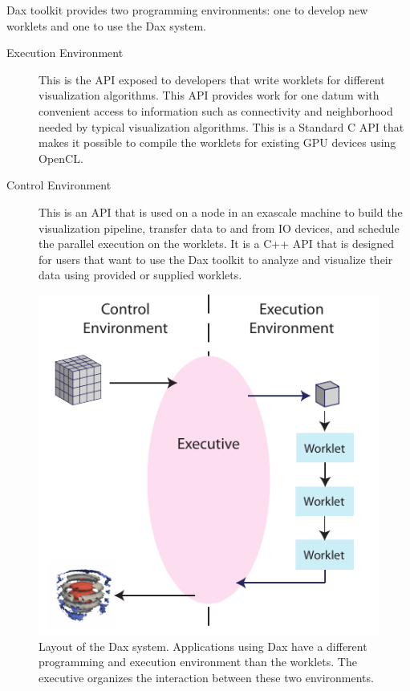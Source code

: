 \documentclass{vgtc}                          %
\begin{document}
Dax toolkit provides two programming environments: one to develop new worklets and one to use the Dax system.

\begin{description}
\item[Execution Environment] This is the API exposed to developers that
write worklets for different visualization algorithms. This API provides
work for one datum with convenient access to information such as
connectivity and neighborhood needed by typical visualization algorithms. This
is a Standard C API that makes it possible to compile the worklets for
existing GPU devices using OpenCL.
\item[Control Environment] This is an API that is used on a node in an
exascale machine to build the visualization pipeline, transfer data to and from
IO devices, and schedule the parallel execution on the worklets. It is a C++ API
that is designed for users that want to use the Dax toolkit to analyze and
visualize their data using provided or supplied worklets.
\end{description}

\begin{figure}
  \centering
  \includegraphics{images/DaxDiagram}
  \caption{Layout of the Dax system.
    Applications using Dax have a different programming and execution environment than the worklets.
    The executive organizes the interaction between these two environments.}
  \label{fig:DaxDiagram}
\end{figure}
\end{document}
